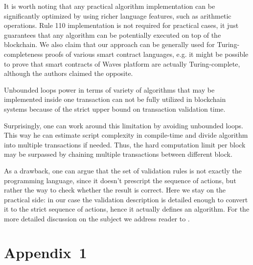 \documentclass[runningheads]{llncs}
\begin{document}
    It is worth noting that any practical algorithm implementation can be
    significantly optimized by using richer language features, such as arithmetic
	operations. Rule 110 implementation is not required for practical cases, it just
    guarantees that any algorithm can be potentially executed on top of the blockchain.
    We also claim that our approach can be generally used for Turing-completeness
    proofs of various smart contract languages, e.g. it might be possible to prove
    that smart contracts of Waves platform \cite{wavesSmarts} are actually
    Turing-complete, although the authors claimed the opposite.

	Unbounded loops power in terms of variety of algorithms that may be implemented
    inside one transaction can not be fully utilized in blockchain systems because of 
	the strict upper bound on transaction validation time.

    Surprisingly, one can work around this limitation by avoiding unbounded loops.
	This way he can estimate script complexity in compile-time
    and divide algorithm into multiple transactions if needed. Thus, the hard
    computation limit per block may be surpassed by chaining multiple transactions
    between different block.

    As a drawback, one can argue that the set of validation rules is not exactly
    the programming language, since it doesn't prescript the sequence of actions,
    but rather the way to check whether the result is correct. Here we stay on the
    practical side: in our case the validation description is detailed enough to
    convert it to the strict sequence of actions, hence it actually defines an
    algorithm. For the more detailed discussion on the subject we address reader
    to .

    
    \section{Appendix~1}
    \label{appendix1}

\end{document}
